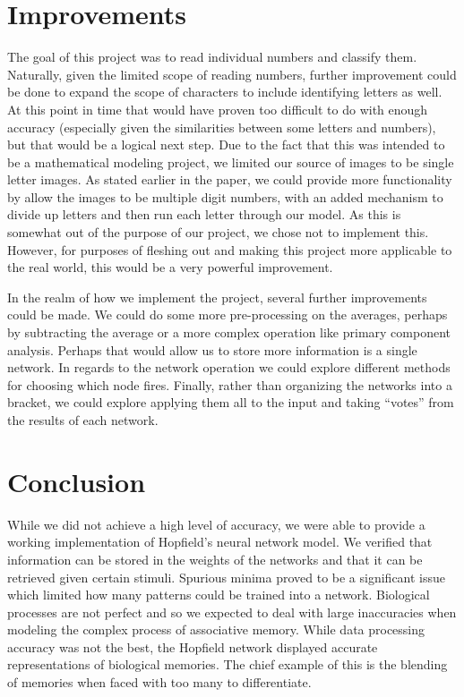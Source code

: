 \documentclass[]{article}
\theoremstyle{plain}
\theoremstyle{definition}
\begin{document}
\section{Improvements}
The goal of this project was to read individual numbers and classify them.  Naturally, given the limited scope of reading numbers, further improvement could be done to expand the scope of characters to include identifying letters as well.  At this point in time that would have proven too difficult to do with enough accuracy (especially given the similarities between some letters and numbers), but that would be a logical next step.  Due to the fact that this was intended to be a mathematical modeling project, we limited our source of images to be single letter images.  As stated earlier in the paper, we could provide more functionality by allow the images to be multiple digit numbers, with an added mechanism to divide up letters and then run each letter through our model.  As this is somewhat out of the purpose of our project, we chose not to implement this.  However, for purposes of fleshing out and making this project more applicable to the real world, this would be a very powerful improvement.

In the realm of how we implement the project, several further improvements could be made. We could do some more pre-processing on the averages, perhaps by subtracting the average or a more complex operation like primary component analysis. Perhaps that would allow us to store more information is a single network. In regards to the network operation we could explore different methods for choosing which node fires. Finally, rather than organizing the networks into a bracket, we could explore applying them all to the input and taking ``votes'' from the results of each network. 

\section{Conclusion}

While we did not achieve a high level of accuracy, we were able to provide a working implementation of Hopfield's neural network model. We verified that information can be stored in the weights of the networks and that it can be retrieved given certain stimuli. Spurious minima proved to be a significant issue which limited how many patterns could be trained into a network. Biological processes are not perfect and so we expected to deal with large inaccuracies when modeling the complex process of associative memory. While data processing accuracy was not the best, the Hopfield network displayed accurate representations of biological memories. The chief example of this is the blending of memories when faced with too many to differentiate. 
\end{document}
